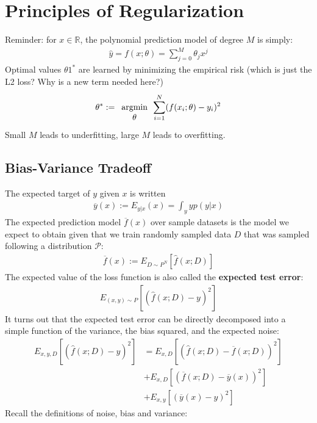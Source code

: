 \documentclass{report}
\newcommand{\tbf}{\textbf}
\newcommand{\argmin}[1] {
    \begin{array}{c}
        \vphantom{#1}\\ %
        \text{argmin}\\
        #1\\
        \end{array}
    }
\newcommand{\yhat}{\hat{y}}
\begin{document}
\chapter{Principles of Regularization}
Reminder: for $x \in \mathbb{R}$, the polynomial prediction model of degree $M$ is simply:
\begin{align}
 \yhat = f(x;\theta) = \sum_{j=0}^M \theta_j x^j
\end{align}
Optimal values $\theta1^*$ are learned by minimizing the empirical risk (which is just the L2 loss? Why is a new term needed here?)
\begin{align}
 \theta^* := \argmin{\theta} \sum_{i=1}^N (f(x_i;\theta)-y_i)^2
\end{align}
Small $M$ leads to underfitting, large $M$ leads to overfitting.
%
\section{Bias-Variance Tradeoff}
The expected target of $y$ given $x$ is written 
\begin{align}
 \overline{y}(x) := E_{y|x}(x) = \int_y y p(y|x)  
\end{align}
The expected prediction model $\overline{f}(x)$ over sample datasets is the model we expect to obtain given that we train randomly sampled data $D$ that was sampled following a distribution $\mathcal{P}$:
\begin{align}
 \overline{f}(x) := E_{D \sim P^N}[\hat{f}(x;D)]
\end{align}
The expected value of the loss function is also called the \tbf{expected test error}:
\begin{align}
 E_{(x,y)\sim P}[(\hat{f}(x;D)-y)^2]
\end{align}
It turns out that the expected test error can be directly decomposed into a simple function of the variance, the bias squared, and the expected noise:
\begin{align}
 E_{x,y,D}[(\hat{f}(x;D)-y)^2] &= E_{x,D}[(\hat{f}(x;D)-\overline{f}(x;D))^2]\\ &+ E_{x,D}[(\overline{f}(x;D) - \overline{y}(x))^2]\\ &+ E_{x,y}[(\overline{y}(x) - y)^2]
\end{align}
Recall the definitions of noise, bias and variance:
\end{document}

